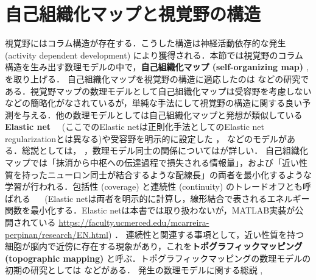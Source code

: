 \section{自己組織化マップと視覚野の構造}視覚野にはコラム構造が存在する．こうした構造は神経活動依存的な発生  (activity dependent development) により獲得される．本節では視覚野のコラム構造を生み出す数理モデルの中で，\textbf{自己組織化マップ (self-organizing map)} \cite{Kohonen1982-mn}, \cite{Kohonen2013-yt}を取り上げる．
自己組織化マップを視覚野の構造に適応したのは\cite{Obermayer1990-gq} \cite{N_V_Swindale1998-ri}などの研究である．視覚野マップの数理モデルとして自己組織化マップは受容野を考慮しないなどの簡略化がなされているが，単純な手法にして視覚野の構造に関する良い予測を与える．他の数理モデルとしては自己組織化マップと発想が類似している \textbf{Elastic net}  \cite{Durbin1987-bp} \cite{Durbin1990-xx} \cite{Carreira-Perpinan2005-gy}　(ここでのElastic netは正則化手法としてのElastic net regularizationとは異なる)や受容野を明示的に設定した \cite{Tanaka2004-vz}， \cite{Ringach2007-oe}などのモデルがある．総説としては\cite{Das2005-mq}，\cite{Goodhill2007-va} ，数理モデル同士の関係については\cite{2002-nm}が詳しい．
自己組織化マップでは「抹消から中枢への伝達過程で損失される情報量」，および「近い性質を持ったニューロン同士が結合するような配線長」の両者を最小化するような学習が行われる．包括性 (coverage) と連続性 (continuity) のトレードオフとも呼ばれる \cite{Carreira-Perpinan2005-gy}　 (Elastic netは両者を明示的に計算し，線形結合で表されるエネルギー関数を最小化する．Elastic netは本書では取り扱わないが，MATLAB実装が公開されている
\url{https://faculty.ucmerced.edu/mcarreira-perpinan/research/EN.html}) ． 連続性と関連する事項として，近い性質を持つ細胞が脳内で近傍に存在する現象があり，これを\textbf{トポグラフィックマッピング (topographic mapping)} と呼ぶ．トポグラフィックマッピングの数理モデルの初期の研究としては\cite{Von_der_Malsburg1973-bz} \cite{Willshaw1976-zo} \cite{Takeuchi1979-mi}などがある．
発生の数理モデルに関する総説 \cite{Van_Ooyen2011-fz}, \cite{Goodhill2018-ho}

